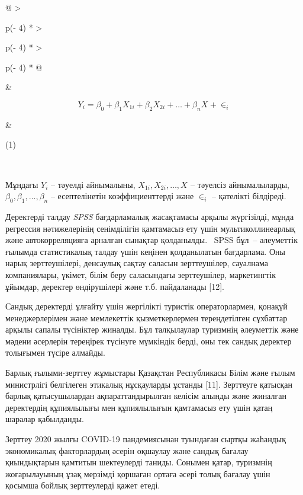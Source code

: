 \begin{longtable}[]{@{}
  >{\raggedright\arraybackslash}p{(\columnwidth - 4\tabcolsep) * }
  >{\raggedright\arraybackslash}p{(\columnwidth - 4\tabcolsep) * }
  >{\raggedright\arraybackslash}p{(\columnwidth - 4\tabcolsep) * }@{}}
\toprule\noalign{}
\begin{minipage}[b]{\linewidth}\raggedright
\end{minipage} & \begin{minipage}[b]{\linewidth}\raggedright
\[Y_{i} = \beta_{0} + \beta_{1}X_{1i} + \beta_{2}X_{2i} + \ldots + \beta_{n}X_{} + \in_{i}\]
\end{minipage} & \begin{minipage}[b]{\linewidth}\raggedright
(1)
\end{minipage} \\
\midrule\noalign{}
\endhead
\bottomrule\noalign{}
\endlastfoot
\end{longtable}

Мұндағы \(Y_{i}\) -- тәуелді айнымалыны, \(X_{1i},X_{2i},\ldots,X_{}\)
-- тәуелсіз айнымалыларды, \(\beta_{0},\beta_{1},\ldots,\beta_{n}\) --
есептелінетін коэффициенттерді және \(\in_{i}\) -- қателікті білдіреді.

Деректерді талдау \emph{SPSS} бағдарламалық жасақтамасы арқылы
жүргізілді, мұнда регрессия нәтижелерінің сенімділігін қамтамасыз ету
үшін мультиколлинеарлық және автокорреляцияға арналған сынақтар
қолданылды. ~SPSS бұл~-- әлеуметтік ғылымда статистикалық талдау үшін
кеңінен қолданылатын бағдарлама. Оны нарық зерттеушілері, денсаулық
сақтау саласын зерттеушілер, сауалнама компаниялары, үкімет, білім беру
саласындағы зерттеушілер, маркетингтік ұйымдар, деректер өндірушілері
және т.б. пайдаланады {[}12{]}.

Сандық деректерді ұлғайту үшін жергілікті туристік операторлармен,
қонақүй менеджерлерімен және мемлекеттік қызметкерлермен тереңдетілген
сұхбаттар арқылы сапалы түсініктер жиналды. Бұл талқылаулар туризмнің
әлеуметтік және мәдени әсерлерін тереңірек түсінуге мүмкіндік берді, оны
тек сандық деректер толығымен түсіре алмайды.

Барлық ғылыми-зерттеу жұмыстары Қазақстан Республикасы Білім және ғылым
министрлігі белгілеген этикалық нұсқауларды ұстанды {[}11{]}. Зерттеуге
қатысқан барлық қатысушылардан ақпараттандырылған келісім алынды және
жиналған деректердің құпиялылығы мен құпиялылығын қамтамасыз ету үшін
қатаң шаралар қабылданды.

Зерттеу 2020 жылғы COVID-19 пандемиясынан туындаған сыртқы жаһандық
экономикалық факторлардың әсерін оқшаулау және сандық бағалау
қиындықтарын қамтитын шектеулерді таниды. Сонымен қатар, туризмнің
жоғарылауының ұзақ мерзімді қоршаған ортаға әсері толық бағалау үшін
қосымша бойлық зерттеулерді қажет етеді.

